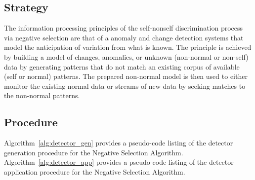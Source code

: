 \subsection{Strategy}
The information processing principles of the self-nonself discrimination process via negative selection are that of a anomaly and change detection systems that model the anticipation of variation from what is known.
The principle is achieved by building a model of changes, anomalies, or unknown (non-normal or non-self) data by generating patterns that do not match an existing corpus of available (self or normal) patterns. The prepared non-normal model is then used to either monitor the existing normal data or streams of new data by seeking matches to the non-normal patterns.

\subsection{Procedure}
Algorithm~\ref{alg:detector_gen} provides a pseudo-code listing of the detector generation procedure for the Negative Selection Algorithm. Algorithm~\ref{alg:detector_app} provides a pseudo-code listing of the detector application procedure for the Negative Selection Algorithm.

